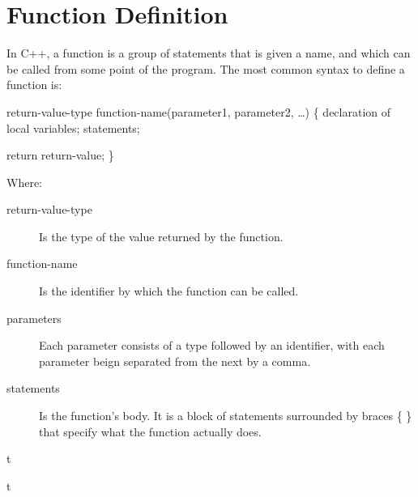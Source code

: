 \documentclass[../lecture4-functions.tex]{subfiles}
\begin{document}
\section{Function Definition}


\begin{frame}[fragile]{}
    In C++, a function is a group of statements that is given a name, and which can be called from some point of the program. The most common syntax to define a function is: \newline

    return-value-type function-name(parameter1, parameter2, \dots) \newline
    \{ \newline
        \quad declaration of local variables; \newline
        \quad statements; \newline

        \quad return return-value; \newline
    \} \newline

    Where:
    \begin{description} %
        \item[return-value-type] Is the type of the value returned by the function.
        \item[function-name]     Is the identifier by which the function can be called.
        \item[parameters] Each parameter consists of a type followed by an identifier, with each parameter beign separated from the next by a comma.
        \item[statements] Is the function's body. It is a block of statements surrounded by braces \{ \} that specify what the function actually does.
    \end{description}
\end{frame}


\begin{frame}[fragile]{}
t
\end{frame}


\begin{frame}[fragile]{}
t
\end{frame}

\end{document}
